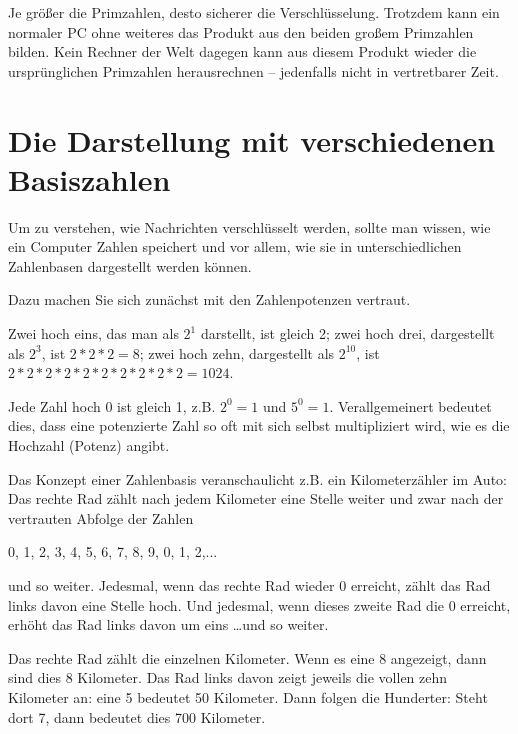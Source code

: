 \documentclass[a4paper,11pt, oneside,openright,titlepage,dvips]{scrbook}
\newcommand{\IncludeImage}[2][]{\texorhtml{%
\texttt{[image: \#2]}%
}{%
\htmlimg{#2.png}%
}}
\newcounter{chapter}
\newcounter{section}[chapter]
\begin{document}
Je größer die Primzahlen, desto sicherer die Verschlüsselung.
Trotzdem kann ein normaler PC ohne weiteres das Produkt aus den beiden
großem Primzahlen bilden. Kein Rechner der Welt dagegen kann aus
diesem Produkt wieder die ursprünglichen Primzahlen herausrechnen --­
jedenfalls nicht in vertretbarer Zeit.


\clearpage
\section{Die Darstellung mit verschiedenen Basiszahlen
 }

Um zu verstehen, wie Nachrichten verschlüsselt werden, sollte man
wissen, wie ein Computer Zahlen speichert und vor allem, wie sie in
unterschiedlichen Zahlenbasen dargestellt werden können.

Dazu machen Sie sich zunächst mit den Zahlenpotenzen vertraut.

Zwei hoch eins, das man als $2^1$ darstellt, ist gleich 2;
zwei hoch drei, dargestellt als $2^3$, ist $2 * 2 * 2 = 8$; zwei
hoch zehn, dargestellt als $2^{10}$, ist $2*2*2*2*2*2*2*2*2*2 = 1024$.

Jede Zahl hoch 0 ist gleich 1, z.B. $2^0 = 1$ und $5^0 = 1$.
Verallgemeinert bedeutet dies, dass eine potenzierte Zahl so oft mit
sich selbst multipliziert wird, wie es die Hochzahl (Potenz) angibt.

Das Konzept einer Zahlenbasis veranschaulicht z.B. ein
Kilometerzähler im Auto: Das rechte Rad zählt nach jedem
Kilometer eine Stelle weiter und zwar nach der vertrauten Abfolge
der Zahlen

0, 1, 2, 3, 4, 5, 6, 7, 8, 9, 0, 1, 2,...

und so weiter. Jedesmal, wenn das rechte Rad wieder 0 erreicht, zählt
das Rad links davon eine Stelle hoch. Und jedesmal, wenn dieses zweite
Rad die 0 erreicht, erhöht das Rad links davon um eins \ldots und so
weiter.


\begin{center}
\IncludeImage[width=0.4\textwidth]{mileage-indicator}
\end{center}

Das rechte Rad zählt die einzelnen Kilometer. Wenn es eine 8
angezeigt, dann sind dies 8 Kilometer. Das Rad links davon zeigt
jeweils die vollen zehn Kilometer an: eine 5 bedeutet 50 Kilometer.
Dann folgen die Hunderter: Steht dort 7, dann bedeutet dies 700
Kilometer.
\end{document}
